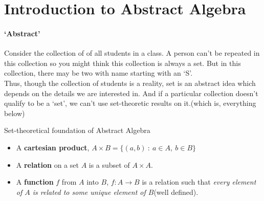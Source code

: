 




\section{Introduction to Abstract Algebra}
\begin{story}
\paragraph{`Abstract'}
Consider the collection of of all students in a class. A person can't be repeated in this collection so you might think this collection is always a set. But in this collection, there may be two with name starting with an `S'.\\

Thus, though the collection of students is a reality, set is an abstract idea which depends on the details we are interested in. And if a particular collection doesn't qualify to be a `set', we can't use set-theoretic results on it.(which is, everything below)
\end{story}

\begin{definition}Set-theoretical foundation of Abstract Algebra
	\begin{itemize}
		\item A \textbf{cartesian product}, $A \times B = \{ (a,b) \ : \ a \in A,\ b \in B \}$ %
		\item A \textbf{relation} on a set $A$ is a subset of $A \times A$. %
		\item A \textbf{function} $f$ from $A$ into $B$, $f : A \to B$ is a relation such that \textit{every element of $A$ is related to some unique element of $B$}(well defined). %
	\end{itemize}
\end{definition}

